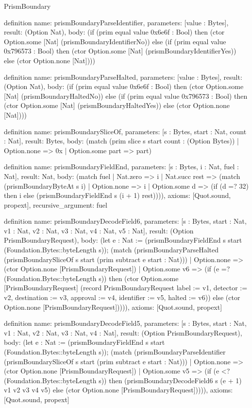 \begin{lexlean}{PrismBoundary}
\begin{semanticmodule}
definition{
  name: prismBoundaryParseIdentifier,
  parameters: [value : Bytes],
  result: (Option Nat),
  body: (if (prim equal value 0x6e6f : Bool) then (ctor Option.some [Nat] (prismBoundaryIdentifierNo)) else (if (prim equal value 0x796573 : Bool) then (ctor Option.some [Nat] (prismBoundaryIdentifierYes)) else (ctor Option.none [Nat])))
}

definition{
  name: prismBoundaryParseHalted,
  parameters: [value : Bytes],
  result: (Option Nat),
  body: (if (prim equal value 0x6e6f : Bool) then (ctor Option.some [Nat] (prismBoundaryHaltedNo)) else (if (prim equal value 0x796573 : Bool) then (ctor Option.some [Nat] (prismBoundaryHaltedYes)) else (ctor Option.none [Nat])))
}

definition{
  name: prismBoundarySliceOf,
  parameters: [s : Bytes, start : Nat, count : Nat],
  result: Bytes,
  body: (match (prim slice s start count : (Option Bytes))
    | Option.none => 0x
    | Option.some part => part)
}

definition{
  name: prismBoundaryFieldEnd,
  parameters: [s : Bytes, i : Nat, fuel : Nat],
  result: Nat,
  body: (match fuel
    | Nat.zero => i
    | Nat.succ rest => (match (prismBoundaryByteAt s i)
      | Option.none => i
      | Option.some d => (if (d =? 32) then i else (prismBoundaryFieldEnd s (i + 1) rest)))),
  axioms: [Quot.sound, propext],
  recursive_argument: fuel
}

definition{
  name: prismBoundaryDecodeField6,
  parameters: [s : Bytes, start : Nat, v1 : Nat, v2 : Nat, v3 : Nat, v4 : Nat, v5 : Nat],
  result: (Option PrismBoundaryRequest),
  body: (let e : Nat := (prismBoundaryFieldEnd s start (Foundation.Bytes::byteLength s)); (match (prismBoundaryParseHalted (prismBoundarySliceOf s start (prim subtract e start : Nat)))
    | Option.none => (ctor Option.none [PrismBoundaryRequest])
    | Option.some v6 => (if (e =? (Foundation.Bytes::byteLength s)) then (ctor Option.some [PrismBoundaryRequest] (record PrismBoundaryRequest {label := v1, detector := v2, destination := v3, approval := v4, identifier := v5, halted := v6})) else (ctor Option.none [PrismBoundaryRequest])))),
  axioms: [Quot.sound, propext]
}

definition{
  name: prismBoundaryDecodeField5,
  parameters: [s : Bytes, start : Nat, v1 : Nat, v2 : Nat, v3 : Nat, v4 : Nat],
  result: (Option PrismBoundaryRequest),
  body: (let e : Nat := (prismBoundaryFieldEnd s start (Foundation.Bytes::byteLength s)); (match (prismBoundaryParseIdentifier (prismBoundarySliceOf s start (prim subtract e start : Nat)))
    | Option.none => (ctor Option.none [PrismBoundaryRequest])
    | Option.some v5 => (if (e <? (Foundation.Bytes::byteLength s)) then (prismBoundaryDecodeField6 s (e + 1) v1 v2 v3 v4 v5) else (ctor Option.none [PrismBoundaryRequest])))),
  axioms: [Quot.sound, propext]
}


\end{semanticmodule}
\end{lexlean}
